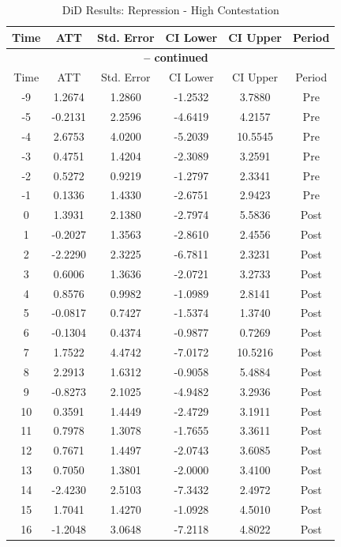 \documentclass[bibtex]{article}
\begin{document}
{\begin{longtable}{cccccc}
\caption{DiD Results: Repression - High Contestation} \label{tab:rep_high} \\
\toprule
Time & ATT & Std. Error & CI Lower & CI Upper & Period \\
\midrule
\endfirsthead
\multicolumn{6}{c}{{\bfseries \tablename\ \thetable{} -- continued}} \\
\toprule
Time & ATT & Std. Error & CI Lower & CI Upper & Period \\
\midrule
\endhead
-9 & 1.2674 & 1.2860 & -1.2532 & 3.7880 & Pre \\
-5 & -0.2131 & 2.2596 & -4.6419 & 4.2157 & Pre \\
-4 & 2.6753 & 4.0200 & -5.2039 & 10.5545 & Pre \\
-3 & 0.4751 & 1.4204 & -2.3089 & 3.2591 & Pre \\
-2 & 0.5272 & 0.9219 & -1.2797 & 2.3341 & Pre \\
-1 & 0.1336 & 1.4330 & -2.6751 & 2.9423 & Pre \\
0 & 1.3931 & 2.1380 & -2.7974 & 5.5836 & Post \\
1 & -0.2027 & 1.3563 & -2.8610 & 2.4556 & Post \\
2 & -2.2290 & 2.3225 & -6.7811 & 2.3231 & Post \\
3 & 0.6006 & 1.3636 & -2.0721 & 3.2733 & Post \\
4 & 0.8576 & 0.9982 & -1.0989 & 2.8141 & Post \\
5 & -0.0817 & 0.7427 & -1.5374 & 1.3740 & Post \\
6 & -0.1304 & 0.4374 & -0.9877 & 0.7269 & Post \\
7 & 1.7522 & 4.4742 & -7.0172 & 10.5216 & Post \\
8 & 2.2913 & 1.6312 & -0.9058 & 5.4884 & Post \\
9 & -0.8273 & 2.1025 & -4.9482 & 3.2936 & Post \\
10 & 0.3591 & 1.4449 & -2.4729 & 3.1911 & Post \\
11 & 0.7978 & 1.3078 & -1.7655 & 3.3611 & Post \\
12 & 0.7671 & 1.4497 & -2.0743 & 3.6085 & Post \\
13 & 0.7050 & 1.3801 & -2.0000 & 3.4100 & Post \\
14 & -2.4230 & 2.5103 & -7.3432 & 2.4972 & Post \\
15 & 1.7041 & 1.4270 & -1.0928 & 4.5010 & Post \\
16 & -1.2048 & 3.0648 & -7.2118 & 4.8022 & Post \\

\end{longtable}}
\end{document}
